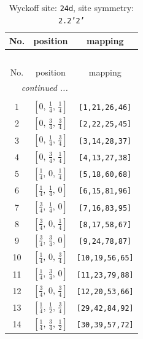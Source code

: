 \documentclass[fleqn,8pt]{jsarticle}
\begin{document}
\begin{longtable}{ccc}
\caption{Wyckoff site: {\tt 24d}, site symmetry: {\tt 2.2'2'}}
 \\
 \hline \hline
No. & position & mapping \\ \hline \endfirsthead

\multicolumn{2}{l}{\tablename\ \thetable{}} \\
 \hline \hline
No. & position & mapping \\ \hline \endhead

 \hline \hline
\multicolumn{2}{r}{\footnotesize\it continued ...} \\ \endfoot

 \hline \hline
\multicolumn{2}{r}{} \\ \endlastfoot

1 & $\left[ 0,\, \frac{1}{4},\, \frac{1}{4} \right]$ & {\tt [1,21,26,46]} \\ \hline
2 & $\left[ 0,\, \frac{3}{4},\, \frac{3}{4} \right]$ & {\tt [2,22,25,45]} \\ \hline
3 & $\left[ 0,\, \frac{1}{4},\, \frac{3}{4} \right]$ & {\tt [3,14,28,37]} \\ \hline
4 & $\left[ 0,\, \frac{3}{4},\, \frac{1}{4} \right]$ & {\tt [4,13,27,38]} \\ \hline
5 & $\left[ \frac{1}{4},\, 0,\, \frac{1}{4} \right]$ & {\tt [5,18,60,68]} \\ \hline
6 & $\left[ \frac{1}{4},\, \frac{1}{4},\, 0 \right]$ & {\tt [6,15,81,96]} \\ \hline
7 & $\left[ \frac{3}{4},\, \frac{1}{4},\, 0 \right]$ & {\tt [7,16,83,95]} \\ \hline
8 & $\left[ \frac{3}{4},\, 0,\, \frac{1}{4} \right]$ & {\tt [8,17,58,67]} \\ \hline
9 & $\left[ \frac{3}{4},\, \frac{3}{4},\, 0 \right]$ & {\tt [9,24,78,87]} \\ \hline
10 & $\left[ \frac{1}{4},\, 0,\, \frac{3}{4} \right]$ & {\tt [10,19,56,65]} \\ \hline
11 & $\left[ \frac{1}{4},\, \frac{3}{4},\, 0 \right]$ & {\tt [11,23,79,88]} \\ \hline
12 & $\left[ \frac{3}{4},\, 0,\, \frac{3}{4} \right]$ & {\tt [12,20,53,66]} \\ \hline
13 & $\left[ \frac{1}{4},\, \frac{1}{2},\, \frac{3}{4} \right]$ & {\tt [29,42,84,92]} \\ \hline
14 & $\left[ \frac{1}{4},\, \frac{3}{4},\, \frac{1}{2} \right]$ & {\tt [30,39,57,72]} \\ \hline

\end{longtable}
\end{document}
